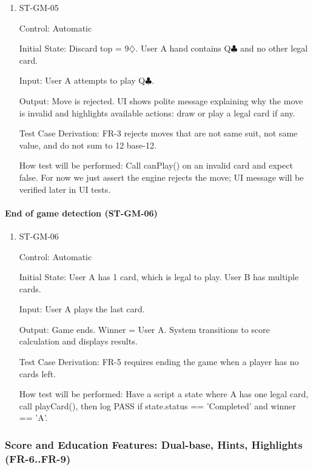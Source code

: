 \documentclass[12pt, titlepage]{article}
\begin{document}
\begin{enumerate}
\item{ST-GM-05\\}

Control: Automatic
					
Initial State: Discard top = 9$\diamondsuit$. User A hand contains Q$\clubsuit$ and no other legal card.
					
Input: User A attempts to play Q$\clubsuit$.
					
Output: Move is rejected. UI shows polite message explaining why the move is invalid and highlights available actions: draw or play a legal card if any.

Test Case Derivation: FR-3 rejects moves that are not same suit, not same value, and do not sum to 12 base-12.

How test will be performed: Call canPlay() on an invalid card and expect false. For now we just assert the engine rejects the move; UI message will be verified later in UI tests.
\end{enumerate}

\paragraph{End of game detection (ST-GM-06)}

\begin{enumerate}
\item{ST-GM-06\\}

Control: Automatic
					
Initial State: User A has 1 card, which is legal to play. User B has multiple cards.
					
Input: User A plays the last card.
					
Output: Game ends. Winner = User A. System transitions to score calculation and displays results.

Test Case Derivation: FR-5 requires ending the game when a player has no cards left.

How test will be performed: Have a script a state where A has one legal card, call playCard(), then log PASS if state.status == 'Completed' and winner == 'A'.
\end{enumerate}

\subsubsection{Score and Education Features: Dual-base, Hints, Highlights (FR-6..FR-9)}
\end{document}
